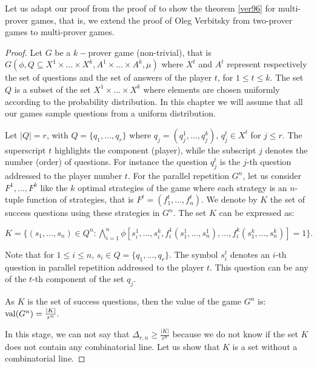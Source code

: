 Let us adapt our proof from the proof of  \cite{verbitsky1996towards} to show the theorem \eqref{ver96} for multi-prover games, that is, we extend the proof of Oleg Verbitsky from two-prover games to multi-prover games.

\begin{proof}
  Let $G$ be a $k-$prover game (non-trivial), that is $G(\phi, Q\subseteq X^1 \times \ldots \times X^k, A^1 \times \ldots \times A^k, \mu)$ where $X^t$ and $A^t$ represent respectively the set of questions and the set of answers of the player $t$, for $1\leq t \leq k.$ The set $Q$ is a subset of the set $X^1 \times \ldots \times X^k$ where elements are chosen uniformly  according to the probability distribution.  In this chapter we will assume that all our games sample questions  from a uniform distribution.

 Let $|Q|=r$, with $Q=\{q_1, \ldots, q_r\}$ where $q_j=(q_j^1,\ldots, q_j^k)$, $q_j^t \in X^t$ for $j\leq r.$ The superscript  $t$ highlights the component (player), while the subscript $j$ denotes the number (order) of questions. For instance the question $q_j^t$ is the $j$-th question addressed to the player number $t.$  For the parallel repetition $G^n$, let us consider $F^1, \ldots, F^k$ like the $k$ optimal strategies of the game where each strategy is an $n$-tuple function of strategies, that is $F^t=(f_1^t,\ldots, f_n^t)$. We denote by $K$ the set of success questions using these strategies in $G^n.$ The set $K$ can be expressed as: 
 
 $K=\{(s_1, \ldots, s_n) \in Q^n: \bigwedge\limits_{i=1}^n \phi \left[ s_i^1, \ldots, s_i^k, f_i^1(s_1^1, \ldots, s_n^1), \ldots, f_i^k(s_1^k, \ldots, s_n^k) \right]=1 \}.$

Note that for $1\leq i \leq n$,  $s_i \in Q=\{q_1, \ldots, q_r\}.$ The symbol $s_i^t$ denotes an $i$-th question in parallel repetition addressed to the player $t$. This question can be any of the $t$-th component of the set  $q_j.$
 
As $K$ is the set of success questions, then the value of the game $G^n$ is: $\mathrm{val} (G^n) = \frac{|K|}{r^n}.$
 
In this stage, we can not say that $\Delta_{r,n} \geq \frac{|K|}{r^n}$
because we do not know if the set  $K$ does not contain any combinatorial line. Let us show that $K$ is a set without a combinatorial line.


\end{proof}
